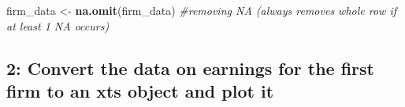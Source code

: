 \documentclass[
]{article}
\newenvironment{Shaded}{\begin{snugshade}}{\end{snugshade}}
\newcommand{\CommentTok}[1]{\textcolor[rgb]{0.56,0.35,0.01}{\textit{#1}}}
\newcommand{\DecValTok}[1]{\textcolor[rgb]{0.00,0.00,0.81}{#1}}
\newcommand{\FunctionTok}[1]{\textcolor[rgb]{0.13,0.29,0.53}{\textbf{#1}}}
\newcommand{\NormalTok}[1]{#1}
\newcommand{\OtherTok}[1]{\textcolor[rgb]{0.56,0.35,0.01}{#1}}
\newcommand{\SpecialCharTok}[1]{\textcolor[rgb]{0.81,0.36,0.00}{\textbf{#1}}}
\begin{document}
\begin{Shaded}
\begin{Highlighting}[]
\NormalTok{firm\_data }\OtherTok{\textless{}{-}} \FunctionTok{na.omit}\NormalTok{(firm\_data) }\CommentTok{\#removing NA (always removes whole row if at least 1 NA occurs)}
\end{Highlighting}
\end{Shaded}

\subsection{2: Convert the data on earnings for the first firm to an xts
object and plot
it}\label{convert-the-data-on-earnings-for-the-first-firm-to-an-xts-object-and-plot-it}

\begin{Shaded}
\end{Shaded}
\end{document}
